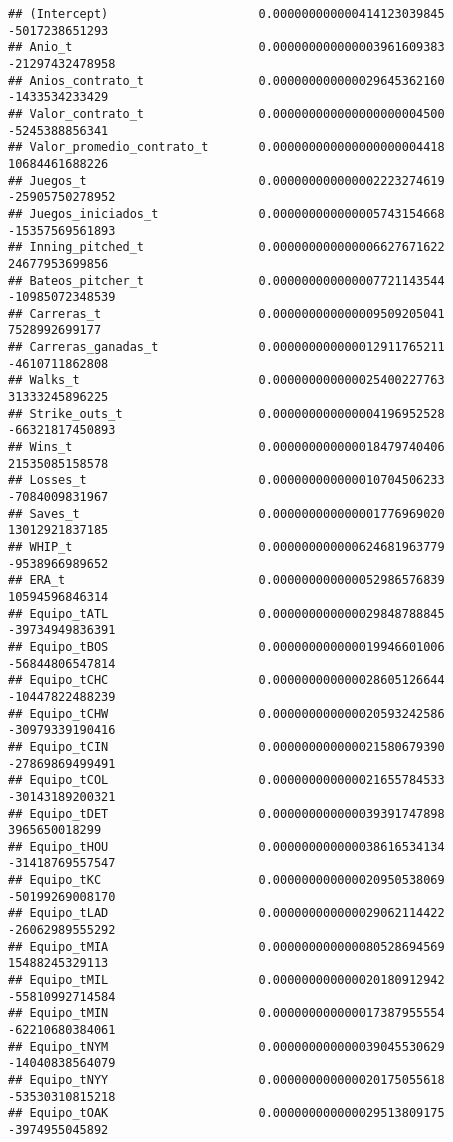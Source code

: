 \documentclass[
]{article}
\begin{document}
\begin{verbatim}
## (Intercept)                     0.000000000000414123039845  -5017238651293
## Anio_t                          0.000000000000003961609383 -21297432478958
## Anios_contrato_t                0.000000000000029645362160  -1433534233429
## Valor_contrato_t                0.000000000000000000004500  -5245388856341
## Valor_promedio_contrato_t       0.000000000000000000004418  10684461688226
## Juegos_t                        0.000000000000002223274619 -25905750278952
## Juegos_iniciados_t              0.000000000000005743154668 -15357569561893
## Inning_pitched_t                0.000000000000006627671622  24677953699856
## Bateos_pitcher_t                0.000000000000007721143544 -10985072348539
## Carreras_t                      0.000000000000009509205041   7528992699177
## Carreras_ganadas_t              0.000000000000012911765211  -4610711862808
## Walks_t                         0.000000000000025400227763  31333245896225
## Strike_outs_t                   0.000000000000004196952528 -66321817450893
## Wins_t                          0.000000000000018479740406  21535085158578
## Losses_t                        0.000000000000010704506233  -7084009831967
## Saves_t                         0.000000000000001776969020  13012921837185
## WHIP_t                          0.000000000000624681963779  -9538966989652
## ERA_t                           0.000000000000052986576839  10594596846314
## Equipo_tATL                     0.000000000000029848788845 -39734949836391
## Equipo_tBOS                     0.000000000000019946601006 -56844806547814
## Equipo_tCHC                     0.000000000000028605126644 -10447822488239
## Equipo_tCHW                     0.000000000000020593242586 -30979339190416
## Equipo_tCIN                     0.000000000000021580679390 -27869869499491
## Equipo_tCOL                     0.000000000000021655784533 -30143189200321
## Equipo_tDET                     0.000000000000039391747898   3965650018299
## Equipo_tHOU                     0.000000000000038616534134 -31418769557547
## Equipo_tKC                      0.000000000000020950538069 -50199269008170
## Equipo_tLAD                     0.000000000000029062114422 -26062989555292
## Equipo_tMIA                     0.000000000000080528694569  15488245329113
## Equipo_tMIL                     0.000000000000020180912942 -55810992714584
## Equipo_tMIN                     0.000000000000017387955554 -62210680384061
## Equipo_tNYM                     0.000000000000039045530629 -14040838564079
## Equipo_tNYY                     0.000000000000020175055618 -53530310815218
## Equipo_tOAK                     0.000000000000029513809175  -3974955045892

\end{verbatim}
\end{document}
